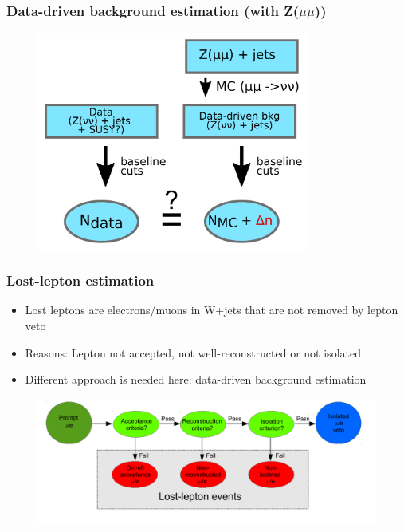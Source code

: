 \begin{frame}
  \frametitle{Data-driven background estimation (with Z($\mu\mu$))}
  \begin{figure}[H]
    \centering
    \includegraphics[width=0.8\textwidth,height=0.8\textheight,keepaspectratio]{figures/ddbe_zmumu}
  \end{figure}
\end{frame}

\begin{frame}
  \frametitle{Lost-lepton estimation}
  \begin{block}{}
  \begin{itemize}
    \item Lost leptons are electrons/muons in W+jets that are not removed by lepton veto
    \item Reasons: Lepton not accepted, not well-reconstructed or not isolated
    \item Different approach is needed here: data-driven background estimation
  \end{itemize}
  \end{block}

  \begin{figure}[H]
    \centering
     \includegraphics[width=\textwidth]{figures/lost-lepton.png}
  \end{figure}
\end{frame}

